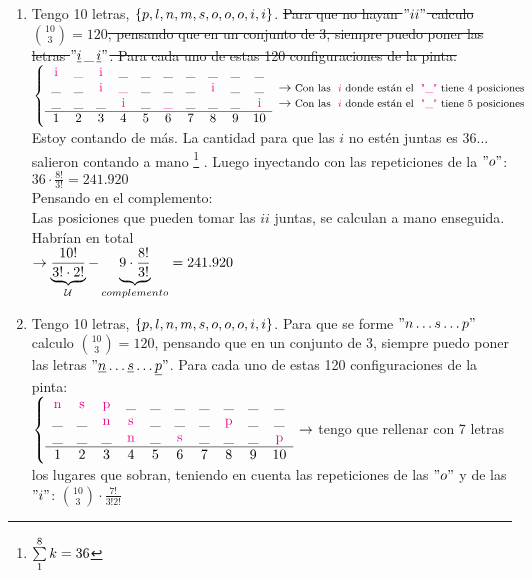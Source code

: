 \documentclass[12pt,a4paper, spanish]{article}
\begin{document}
\begin{enumerate}[label=\roman*)]
	\item
	      Tengo 10 letras, $\left\{ p,l,n,m,s,o,o,o,i,i \right\}$. \sout{Para que no hayan $"ii"$ calculo $\binom{10}{3} = 120$, pensando que en un conjunto de 3, siempre
		      puedo poner las letras $"\underline{i}\, \_ \, \underline{i} "$. Para cada uno de estas 120 configuraciones de la pinta:}  \\
	      $\llave{c c c c c c c c c c c} %
		      {
			      \magenta{i} & \magenta{\_} & \magenta{i} & \_ & \_ & \_ & \_ &\_ & \_ & \_\\
			      \_ & \_ & \magenta{i} & \magenta{\_} & \_ & \_ & \_ &\magenta{i} & \_ & \_ & \to \text{\footnotesize Con las \magenta{$i$} donde están el \magenta{"\_"} tiene 4 posiciones}\\
			      \_ & \_ & \_ & \magenta{i} & \_ & \magenta{\_} & \_ &\_ & \_ & \magenta{i}& \to \text{\footnotesize Con las \magenta{$i$} donde están el \magenta{"\_"} tiene 5 posiciones} \\ \cline{1-10}
			      1 & 2 & 3 & 4 & 5 & 6 & 7 & 8 & 9 & 10
		      } \\
	      $ Estoy contando de más. La cantidad para que las $i$ no estén juntas es 36... salieron contando a mano 
	      \footnote{$\sum\limits_{1}^{8} k = 36$}
	      .
	      Luego inyectando con las repeticiones de la $"o"$: $36 \cdot \frac{8!}{3!} = 241.920 $\\
        Pensando en el complemento:\\
	      Las posiciones que pueden tomar las $ii$ juntas, se calculan a mano enseguida. Habrían en total \\
        $\to \underbrace{\frac{10!}{3! \cdot 2!}}_\mathcal U - \underbrace{9 \cdot \frac{8!}{3!}}_{complemento} = 241.920 $


	\item
	      Tengo 10 letras, $\left\{ p,l,n,m,s,o,o,o,i,i \right\}$. Para que se forme  $"n\dots s \dots p"$ calculo $\binom{10}{3} = 120$, pensando que en un conjunto de 3, siempre
	      puedo poner las letras $"\underline{n}\dots \underline s \dots \underline{p} "$. Para cada uno de estas 120 configuraciones de la pinta: \\
	      $\llave{c c c c c c c c c c} %
		      {
			      \magenta{n} & \magenta{s} & \magenta{p} & \_ & \_ & \_ & \_ &\_ & \_ & \_\\
			      \_ & \_ & \magenta{n} & \magenta{s} & \_ & \_ & \_ &\magenta{p} & \_ & \_\\
			      \_ & \_ & \_ & \magenta{n} & \_ & \magenta{s} & \_ &\_ & \_ & \magenta{p}\\ \hline
			      1 & 2 & 3 & 4 & 5 & 6 & 7 & 8 & 9 & 10
		      } \to
	      $ tengo que rellenar con 7 letras los lugares que sobran, teniendo en cuenta las repeticiones de las $"o"$ y de las $"i"$:
	      $\binom{10}{3} \cdot \frac{7!}{3!2!}$
\end{enumerate}
\end{document}
